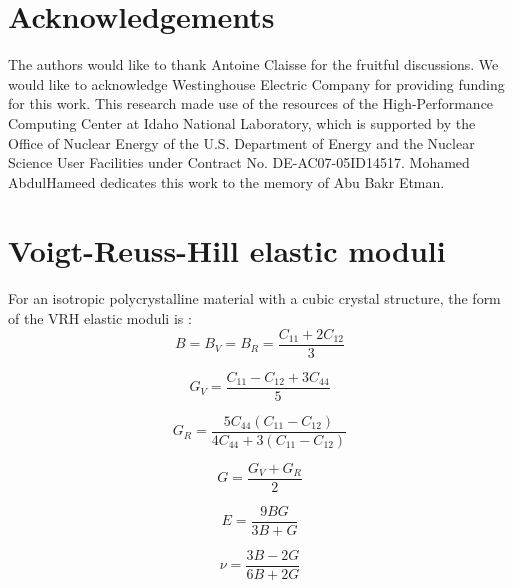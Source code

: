 \documentclass[preprint, 12pt]{elsarticle}
\begin{document}
\section*{Acknowledgements}

The authors would like to thank Antoine Claisse for the fruitful discussions. We would like to acknowledge Westinghouse Electric Company for providing funding for this work. This research made use of the resources of the High-Performance Computing Center at Idaho National Laboratory, which is supported by the Office of Nuclear Energy of the U.S. Department of Energy and the Nuclear Science User Facilities under Contract No. DE-AC07-05ID14517. Mohamed AbdulHameed dedicates this work to the memory of Abu Bakr Etman.

\appendix

\section{Voigt-Reuss-Hill elastic moduli}
\label{appelas}
For an isotropic polycrystalline material with a cubic crystal structure, the form of the VRH elastic moduli is \cite{Anderson1963, Rosler2007}:
\begin{equation}
B = B_V = B_R = \frac{C_{11} + 2 C_{12}}{3}
\label{Eq:KV}
\end{equation}

\begin{equation}
G_V = \frac{C_{11}-C_{12}+3C_{44}}{5}
\label{Eq:GV}
\end{equation}

\begin{equation}
G_R = \frac{5 C_{44} \left( C_{11}-C_{12} \right) }{4 C_{44} + 3 \left( C_{11}-C_{12} \right)}
\label{Eq:GR}
\end{equation}

\begin{equation}
G = \frac{G_V + G_R}{2}
\end{equation}

\begin{equation}
E = \frac{9BG}{3B+G}
\end{equation}

\begin{equation}
\nu = \frac{3B-2G}{6B+2G}
\end{equation}
\end{document}
